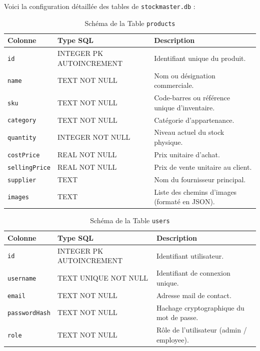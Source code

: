 \documentclass[12pt,a4paper]{report}
\begin{document}
Voici la configuration détaillée des tables de \texttt{stockmaster.db} :

\begin{table}[htbp]
\centering
\caption{Schéma de la Table \texttt{products}}
\begin{tabularx}{\textwidth}{l l X}
\toprule
\textbf{Colonne} & \textbf{Type SQL} & \textbf{Description} \\
\midrule
\texttt{id} & INTEGER PK AUTOINCREMENT & Identifiant unique du produit. \\
\texttt{name} & TEXT NOT NULL & Nom ou désignation commerciale. \\
\texttt{sku} & TEXT NOT NULL & Code-barres ou référence unique d'inventaire. \\
\texttt{category} & TEXT NOT NULL & Catégorie d'appartenance. \\
\texttt{quantity} & INTEGER NOT NULL & Niveau actuel du stock physique. \\
\texttt{costPrice} & REAL NOT NULL & Prix unitaire d'achat. \\
\texttt{sellingPrice} & REAL NOT NULL & Prix de vente unitaire au client. \\
\texttt{supplier} & TEXT & Nom du fournisseur principal. \\
\texttt{images} & TEXT & Liste des chemins d'images (formaté en JSON). \\
\bottomrule
\end{tabularx}
\end{table}

\begin{table}[htbp]
\centering
\caption{Schéma de la Table \texttt{users}}
\begin{tabularx}{\textwidth}{l l X}
\toprule
\textbf{Colonne} & \textbf{Type SQL} & \textbf{Description} \\
\midrule
\texttt{id} & INTEGER PK AUTOINCREMENT & Identifiant utilisateur. \\
\texttt{username} & TEXT UNIQUE NOT NULL & Identifiant de connexion unique. \\
\texttt{email} & TEXT NOT NULL & Adresse mail de contact. \\
\texttt{passwordHash} & TEXT NOT NULL & Hachage cryptographique du mot de passe. \\
\texttt{role} & TEXT NOT NULL & Rôle de l'utilisateur (admin / employee). \\
\bottomrule
\end{tabularx}
\end{table}
\end{document}
